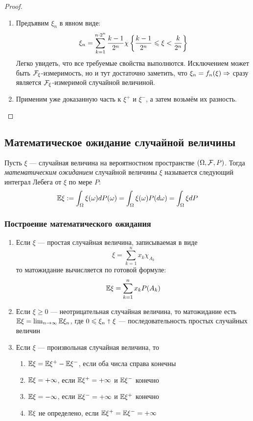 \begin{proof}~
	\begin{enumerate}
		\item Предъявим $\xi_n$ в явном виде:
		\[
			\xi_n = \sum_{k = 1}^{n \cdot 2^n} \frac{k - 1}{2^n} \chi\left\{\frac{k - 1}{2^n} \leqslant \xi < \frac{k}{2^n}\right\}
		\]
		Легко увидеть, что все требуемые свойства выполнются. Исключением может быть $\mathcal{F}_\xi$-измеримость, но и тут достаточно заметить, что $\xi_n = f_n(\xi) \Rightarrow$ сразу является $\mathcal{F}_\xi$-измеримой случайной величиной.
		
		\item Применим уже доказанную часть к $\xi^+$ и $\xi^-$, а затем возьмём их разность.
	\end{enumerate}
\end{proof}

\subsection{Математическое ожидание случайной величины}

\begin{definition}
	Пусть $\xi$ --- случайная величина на вероятностном пространстве $(\Omega, \mathcal{F}, P)$. Тогда \textit{математическим ожиданием} случайной величины $\xi$ называется следующий интеграл Лебега от $\xi$ по мере $P$:
	\[
		\mathbb{E}\xi := \int_\Omega \xi(\omega)dP(\omega) = \int_\Omega \xi(\omega)P(d\omega) = \int_\Omega \xi dP
	\]
\end{definition}

\subsubsection*{Построение математического ожидания}

\begin{enumerate}
	\item Если $\xi$ --- простая случайная величина, записываемая в виде
	\[
		\xi = \sum_{k = 1}^n x_k\chi_{A_k}
	\]
	то матожидание вычисляется по готовой формуле:
	\[
		\mathbb{E}\xi = \sum_{k = 1}^n x_kP(A_k)
	\]
	
	\item Если $\xi \ge 0$ --- неотрицательная случайная величина, то матожидание есть $\mathbb{E}\xi = \lim_{n \to \infty} \mathbb{E}\xi_n$, где $0 \leqslant \xi_n \shortuparrow \xi$ --- последовательность простых случайных величин
	
	\item Если $\xi$ --- произвольная случайная величина, то 
	\begin{enumerate}
		\item $\mathbb{E}\xi = \mathbb{E}\xi^+ - \mathbb{E}\xi^-$, если оба числа справа конечны
		
		\item $\mathbb{E}\xi = +\infty$, если $\mathbb{E}\xi^+ = +\infty$ и $\mathbb{E}\xi^-$ конечно
		
		\item $\mathbb{E}\xi = -\infty$, если $\mathbb{E}\xi^- = +\infty$ и $\mathbb{E}\xi^+$ конечно
		
		\item $\mathbb{E}\xi$ не определено, если $\mathbb{E}\xi^+ = \mathbb{E}\xi^- = +\infty$
	\end{enumerate}
\end{enumerate}

